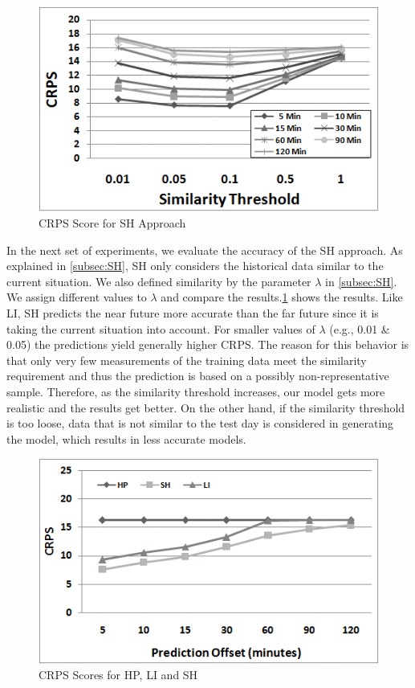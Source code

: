 \begin{figure}
	\centering
	\includegraphics[width = 0.7\columnwidth]{figures/Links_Filtered.png}
	\caption{CRPS Score for SH Approach}\label{fig:SH}
\end{figure}

In the next set of experiments, we evaluate the accuracy of the SH approach. As explained in \cref{subsec:SH}, SH only considers the historical data similar to the current situation. We also defined similarity by the parameter $\lambda$ in \cref{subsec:SH}. We assign different values to $\lambda$ and compare the results.\cref{fig:SH} shows the results. Like LI, SH predicts the near future more accurate than the far future since it is taking the current situation into account. For smaller values of $\lambda$ (e.g., 0.01 \& 0.05) the predictions yield generally higher CRPS. The reason for this behavior is that only very few measurements of the training data meet the similarity
requirement and thus the prediction is based on a possibly non-representative sample. Therefore, as the similarity threshold increases, our model gets more realistic and the results get better. On the other hand, if the similarity
threshold is too loose, data that is not similar to the test day is considered in generating the model, which results in less accurate models.

\begin{figure}[h]
	\centering
	\includegraphics[width = 0.7\columnwidth]{figures/Links_Best.png}
	\caption{CRPS Scores for HP, LI and SH}\label{fig:all_results}
\end{figure}

